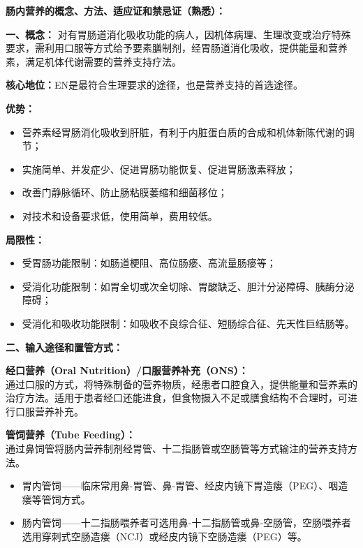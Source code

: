 \begin{tipbox}
\textbf{肠内营养的概念、方法、适应证和禁忌证（熟悉）：}

\textbf{一、概念：}
对有胃肠道消化吸收功能的病人，因机体病理、生理改变或治疗特殊要求，需利用口服等方式给予要素膳制剂，经胃肠道消化吸收，提供能量和营养素，满足机体代谢需要的营养支持疗法。

\textbf{核心地位：}EN是最符合生理要求的途径，也是营养支持的首选途径。

\textbf{优势：}
\begin{itemize}[leftmargin=*]
    \item 营养素经胃肠消化吸收到肝脏，有利于内脏蛋白质的合成和机体新陈代谢的调节；
    \item 实施简单、并发症少、促进胃肠功能恢复、促进胃肠激素释放；
    \item 改善门静脉循环、防止肠粘膜萎缩和细菌移位；
    \item 对技术和设备要求低，使用简单，费用较低。
\end{itemize}

\textbf{局限性：}
\begin{itemize}[leftmargin=*]
    \item 受胃肠功能限制：如肠道梗阻、高位肠瘘、高流量肠瘘等；
    \item 受消化功能限制：如胃全切或次全切除、胃酸缺乏、胆汁分泌障碍、胰酶分泌障碍；
    \item 受消化和吸收功能限制：如吸收不良综合征、短肠综合征、先天性巨结肠等。
\end{itemize}

\textbf{二、输入途径和置管方式：}

\textbf{经口营养（Oral Nutrition）/口服营养补充（ONS）：}\\
通过口服的方式，将特殊制备的营养物质，经患者口腔食入，提供能量和营养素的治疗方法。适用于患者经口还能进食，但食物摄入不足或膳食结构不合理时，可进行口服营养补充。

\textbf{管饲营养（Tube Feeding）：}\\
通过鼻饲管将肠内营养制剂经胃管、十二指肠管或空肠管等方式输注的营养支持方法。
\begin{itemize}[leftmargin=*]
    \item 胃内管饲——临床常用鼻-胃管、鼻-胃管、经皮内镜下胃造瘘（PEG）、咽造瘘等管饲方式。
    \item 肠内管饲——十二指肠喂养者可选用鼻-十二指肠管或鼻-空肠管，空肠喂养者选用穿刺式空肠造瘘（NCJ）或经皮内镜下空肠造瘘（PEG）等。
\end{itemize}


\end{tipbox}

